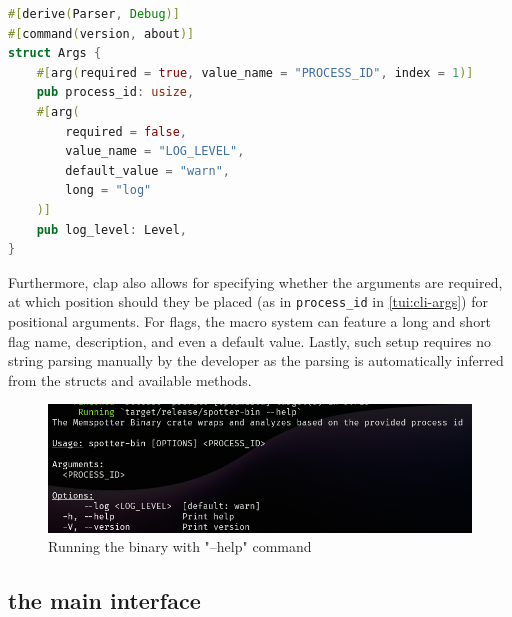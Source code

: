 \begin{lstlisting}[caption=\label{tui:cli-args}"The command line arguments struct", language=Rust]
#[derive(Parser, Debug)]
#[command(version, about)]
struct Args {
    #[arg(required = true, value_name = "PROCESS_ID", index = 1)]
    pub process_id: usize,
    #[arg(
        required = false,
        value_name = "LOG_LEVEL",
        default_value = "warn",
        long = "log"
    )]
    pub log_level: Level,
}
\end{lstlisting}

Furthermore, clap also allows for specifying whether the arguments are required, at which position should they be placed (as in \verb|process_id| in \autoref{tui:cli-args}) for positional arguments.
For flags, the macro system can feature a long and short flag name, description, and even a default value.
Lastly, such setup requires no string parsing manually by the developer as the parsing is automatically inferred from the structs and available methods.

    \begin{figure}
        \centering
        \includegraphics[width=0.5\linewidth]{cli-help.png}
        \caption{Running the binary with "--help" command}
        \label{fig:cli-help}
    \end{figure}

\subsection{the main interface}

